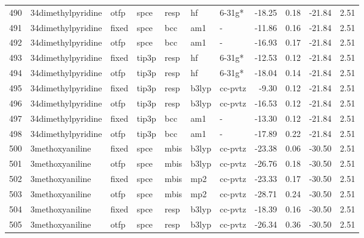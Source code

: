 \begin{tabular}{lllllllrrrr}
490 &            34dimethylpyridine &   otfp &   spce &   resp &      hf &       6-31g* &      -18.25 &     0.18 &      -21.84 &      2.51 \\
491 &            34dimethylpyridine &  fixed &   spce &    bcc &     am1 &            - &      -11.86 &     0.16 &      -21.84 &      2.51 \\
492 &            34dimethylpyridine &   otfp &   spce &    bcc &     am1 &            - &      -16.93 &     0.17 &      -21.84 &      2.51 \\
493 &            34dimethylpyridine &  fixed &  tip3p &   resp &      hf &       6-31g* &      -12.53 &     0.12 &      -21.84 &      2.51 \\
494 &            34dimethylpyridine &   otfp &  tip3p &   resp &      hf &       6-31g* &      -18.04 &     0.14 &      -21.84 &      2.51 \\
495 &            34dimethylpyridine &  fixed &  tip3p &   resp &   b3lyp &      cc-pvtz &       -9.30 &     0.12 &      -21.84 &      2.51 \\
496 &            34dimethylpyridine &   otfp &  tip3p &   resp &   b3lyp &      cc-pvtz &      -16.53 &     0.12 &      -21.84 &      2.51 \\
497 &            34dimethylpyridine &  fixed &  tip3p &    bcc &     am1 &            - &      -13.30 &     0.12 &      -21.84 &      2.51 \\
498 &            34dimethylpyridine &   otfp &  tip3p &    bcc &     am1 &            - &      -17.89 &     0.22 &      -21.84 &      2.51 \\
500 &               3methoxyaniline &  fixed &   spce &   mbis &   b3lyp &      cc-pvtz &      -23.38 &     0.06 &      -30.50 &      2.51 \\
501 &               3methoxyaniline &   otfp &   spce &   mbis &   b3lyp &      cc-pvtz &      -26.76 &     0.18 &      -30.50 &      2.51 \\
502 &               3methoxyaniline &  fixed &   spce &   mbis &     mp2 &      cc-pvtz &      -23.33 &     0.17 &      -30.50 &      2.51 \\
503 &               3methoxyaniline &   otfp &   spce &   mbis &     mp2 &      cc-pvtz &      -28.71 &     0.24 &      -30.50 &      2.51 \\
504 &               3methoxyaniline &  fixed &   spce &   resp &   b3lyp &      cc-pvtz &      -18.39 &     0.16 &      -30.50 &      2.51 \\
505 &               3methoxyaniline &   otfp &   spce &   resp &   b3lyp &      cc-pvtz &      -26.34 &     0.36 &      -30.50 &      2.51 \\

\end{tabular}
